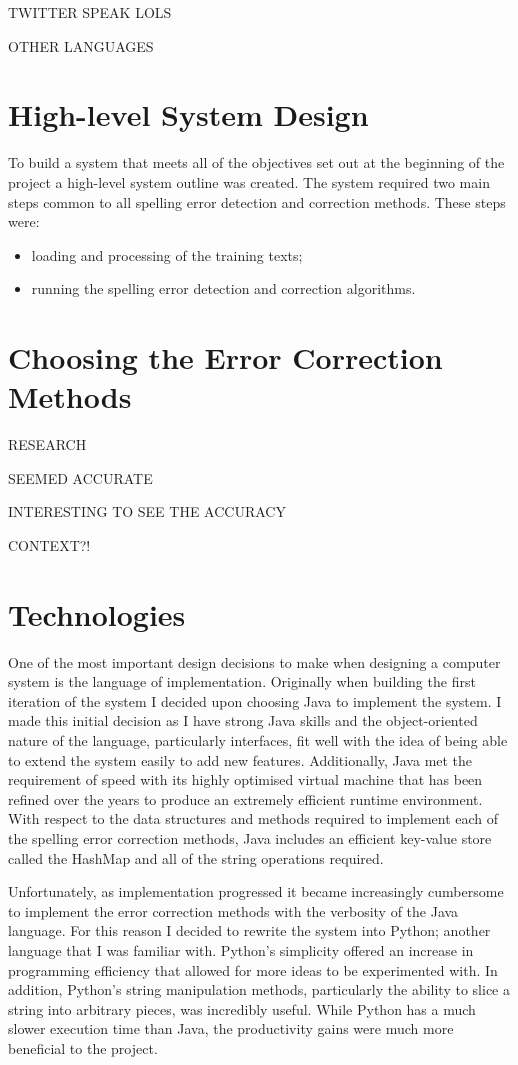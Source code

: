 TWITTER SPEAK LOLS

OTHER LANGUAGES

\section{High-level System Design}
To build a system that meets all of the objectives set out at the beginning of the project a high-level system outline was created. The system required two main steps common to all spelling error detection and correction methods. These steps were:
\begin{itemize}
	\item
	loading and processing of the training texts;
	\item
	running the spelling error detection and correction algorithms.
\end{itemize}

\section{Choosing the Error Correction Methods}
RESEARCH

SEEMED ACCURATE

INTERESTING TO SEE THE ACCURACY

CONTEXT?!



\section{Technologies}
One of the most important design decisions to make when designing a computer system is the language of implementation. Originally when building the first iteration of the system I decided upon choosing Java to implement the system. I made this initial decision as I have strong Java skills and the object-oriented nature of the language, particularly interfaces, fit well with the idea of being able to extend the system easily to add new features. Additionally, Java met the requirement of speed with its highly optimised virtual machine that has been refined over the years to produce an extremely efficient runtime environment. With respect to the data structures and methods required to implement each of the spelling error correction methods, Java includes an efficient key-value store called the HashMap and all of the string operations required.

Unfortunately, as implementation progressed it became increasingly cumbersome to implement the error correction methods with the verbosity of the Java language. For this reason I decided to rewrite the system into Python; another language that I was familiar with. Python's simplicity offered an increase in programming efficiency that allowed for more ideas to be experimented with. In addition, Python's string manipulation methods, particularly the ability to slice a string into arbitrary pieces, was incredibly useful. While Python has a much slower execution time than Java, the productivity gains were much more beneficial to the project.

